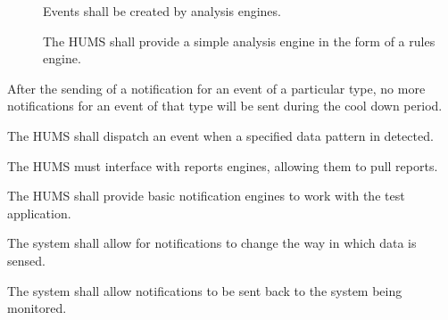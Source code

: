\begin{description}
\begin{description}
			\item[] Events shall be created by analysis engines.

 			\item[] The HUMS shall provide a simple analysis 	
			engine in the form of a rules engine.
	\end{description}
	
	\item[\fr{8}]After the sending of a notification for an event of a particular 
		type, no more notifications for an event of that type will be 	
		sent during the cool down period.
	\item[\fr{9}]The HUMS shall dispatch an event when a specified data 
		pattern in detected.
	\item[\fr{10}] The HUMS must interface with reports engines, allowing 
		them to pull reports.
	\item[\fr{11}] The HUMS shall provide basic notification 			
		engines to work with the test application.
	\item[\fr{12}] The system shall allow for notifications to change the way 
		in which data is sensed.
	 \item[\fr{13}] The system shall allow notifications to be sent back to 
		the system being monitored.
\end{description}


